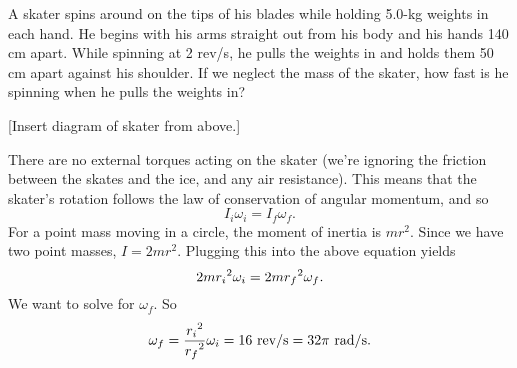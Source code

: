 A skater spins around on the tips of his blades while holding 5.0-kg weights in each hand. He begins with his arms straight out from his body and his hands 140 cm apart. While spinning at 2 rev/s, he pulls the weights in and holds them 50 cm apart against his shoulder. If we neglect the mass of the skater, how fast is he spinning when he pulls the weights in?

[Insert diagram of skater from above.]
\vspace{5cm}

There are no external torques acting on the skater (we're ignoring the friction between the skates and the ice, and any air resistance). This means that the skater's rotation follows the law of conservation of angular momentum, and so
$$I_i\omega_i=I_f\omega_f.$$
For a point mass moving in a circle, the moment of inertia is $mr^2$. Since we have two point masses, $I=2mr^2$. Plugging this into the above equation yields
$$2mr_i\displaystyle^2\omega_i=2mr_f\displaystyle^2\omega_f.$$
We want to solve for $\omega_f$. So
$$\omega_f=\frac{r_i\displaystyle^2}{r_f\displaystyle^2}\omega_i=16\mbox{ rev/s}=32\pi\mbox{ rad/s}.$$


